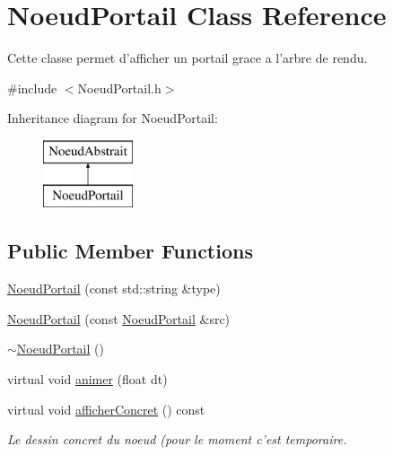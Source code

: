 \hypertarget{class_noeud_portail}{\section{Noeud\-Portail Class Reference}
\label{class_noeud_portail}
}


Cette classe permet d'afficher un portail grace a l'arbre de rendu.  




{\ttfamily \#include $<$Noeud\-Portail.\-h$>$}

Inheritance diagram for Noeud\-Portail\-:\begin{figure}[H]
\begin{center}
\leavevmode
\includegraphics[height=2.000000cm]{class_noeud_portail}
\end{center}
\end{figure}
\subsection*{Public Member Functions}
\begin{DoxyCompactItemize}
\item 
\hyperlink{class_noeud_portail_a2b2679b209572bfec9c4fbaba1db7fd6}{Noeud\-Portail} (const std\-::string \&type)
\item 
\hyperlink{class_noeud_portail_a9fc4028c467afd1ae588feb679f4ff35}{Noeud\-Portail} (const \hyperlink{class_noeud_portail}{Noeud\-Portail} \&src)
\item 
\hyperlink{class_noeud_portail_a539e125201edd719886ae550eab35a28}{$\sim$\-Noeud\-Portail} ()
\item 
virtual void \hyperlink{class_noeud_portail_ad172adb0152d25d14892049f4f2b10a5}{animer} (float dt)
\item 
\hypertarget{class_noeud_portail_a282c4e5f63044fbc8db47b7c11f9cd04}{virtual void \hyperlink{class_noeud_portail_a282c4e5f63044fbc8db47b7c11f9cd04}{afficher\-Concret} () const }\label{class_noeud_portail_a282c4e5f63044fbc8db47b7c11f9cd04}

\begin{DoxyCompactList}\small\item\em Le dessin concret du noeud (pour le moment c'est temporaire. \end{DoxyCompactList}\end{DoxyCompactItemize}
